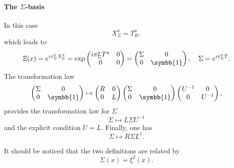 \paragraph{The $\Sigma$-basis} In this case  
\begin{equation}
  X^a_\Sigma = T^a_R ,
\end{equation}
which leads to
\begin{equation}
  \Xi (x) = e^{i \pi^a_\Sigma X^a_\Sigma} = \exp{\begin{pmatrix} i \pi^a_\Sigma T^a & 0 \\ 0 & 0 \end{pmatrix}} = \begin{pmatrix} \Sigma & 0 \\ 0 & \symbb{1} \end{pmatrix} , \quad \Sigma = e^{i \pi^a_\Sigma T} .
\end{equation}
The transformation law  
\begin{equation}
  \begin{pmatrix} \Sigma & 0 \\ 0 & \symbb{1} \end{pmatrix} \mapsto
  \begin{pmatrix} R & 0 \\ 0 & L \end{pmatrix}
  \begin{pmatrix} \Sigma & 0 \\ 0 & \symbb{1} \end{pmatrix} 
  \begin{pmatrix} U^{-1} & 0 \\ 0 & U^{-1} \end{pmatrix} ,
\end{equation}
provides the transformation law for $\Sigma$
\begin{equation}
  \Sigma \mapsto L \Sigma U^{-1}  
\end{equation}
and the explicit condition $U = L$. Finally, one has
\begin{equation}
  \Sigma \mapsto R \Sigma L^\dagger .
\end{equation}

It should be noticed that the two definitions are related by
\begin{equation}
  \Sigma (x) = \xi^2 (x) .
\end{equation}

